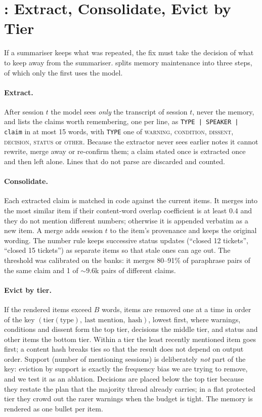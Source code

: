 \section{\ledger{}: Extract, Consolidate, Evict by Tier}
\label{sec:method}

If a summariser keeps what was repeated, the fix must take the decision of what to keep away from the summariser.
\ledger{} splits memory maintenance into three steps, of which only the first uses the model.

\paragraph{Extract.}
After session $t$ the model sees \emph{only} the transcript of session $t$, never the memory, and lists the claims worth remembering, one per line, as \texttt{TYPE | SPEAKER | claim} in at most 15 words, with \texttt{TYPE} one of \textsc{warning}, \textsc{condition}, \textsc{dissent}, \textsc{decision}, \textsc{status} or \textsc{other}.
Because the extractor never sees earlier notes it cannot rewrite, merge away or re-confirm them; a claim stated once is extracted once and then left alone.
Lines that do not parse are discarded and counted.

\paragraph{Consolidate.}
Each extracted claim is matched in code against the current items.
It merges into the most similar item if their content-word overlap coefficient is at least $0.4$ and they do not mention different numbers; otherwise it is appended verbatim as a new item.
A merge adds session $t$ to the item's provenance and keeps the original wording.
The number rule keeps successive status updates (``closed 12 tickets'', ``closed 15 tickets'') as separate items so that stale ones can age out.
The threshold was calibrated on the banks: it merges 80--91\% of paraphrase pairs of the same claim and 1 of ${\sim}9.6$k pairs of different claims.

\paragraph{Evict by tier.}
If the rendered items exceed $B$ words, items are removed one at a time in order of the key
$(\mathrm{tier}(\text{type}),\ \text{last mention},\ \text{hash})$, lowest first, where warnings, conditions and dissent form the top tier, decisions the middle tier, and status and other items the bottom tier.
Within a tier the least recently mentioned item goes first; a content hash breaks ties so that the result does not depend on output order.
Support (number of mentioning sessions) is deliberately \emph{not} part of the key: eviction by support is exactly the frequency bias we are trying to remove, and we test it as an ablation.
Decisions are placed below the top tier because they restate the plan that the majority thread already carries; in a flat protected tier they crowd out the rarer warnings when the budget is tight.
The memory is rendered as one bullet per item.

